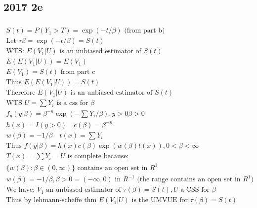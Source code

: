 \documentclass{article}
\newcommand{\B}{\beta}
\begin{document}
\begin{flushleft}

	\section*{2017 2e}
	
	\item 
\begin{multline*}\\
S(t)=P(Y_1>T)=\exp\left(-t/\B \right) \text{ (from part b)}\\
\text{Let } \tau{\B}=\exp\left(-t/\B \right)=S(t)\\
\text{WTS: }  E(V_1|U) \text{ is an unbiased estimator of } S(t)\\
E(E(V_1|U))=E(V_1)\\
E(V_1)=S(t) \text{ from part c}\\
\text{Thus } E(E(V_1|U))=S(t)\\
\text{Therefore } E(V_1|U) \text{ is an unbiased estimator of } S(t)\\
\text{WTS } U=\sum Y_i \text{ is a css for } \B\\
f_y(y|\B)=\B^{-n}\exp\left(-\sum Y_i/\B \right) , y>0 \B>0\\
h(x)=I(y>0) \quad c(\B)=\B^{-n}\\
w(\B)=-1/\B \quad t(x)=\sum Y_i\\
\text{Thus } f(y|\B)=h(x)c(\B)\exp\left(w(\B)t(x)\right),  0<\B<\infty\\
T(x)=\sum Y_i=U \text{ is complete because:}\\
\{w(\B):\B\in (0,\infty)\} \text{ contains an open set in } R^1\\
w(\B)=-1/\B,\B>0=(-\infty,0) \text{ in } R^{-1} \text{ (the range contains an open set in } R^1)\\
\text{We have: } V_1 \text{ an unbiased estimator of } \tau(\B)=S(t), U \text{ a CSS for } \B\\
\text{Thus by lehmann-scheffe thm } E(V_1|U) \text{ is the UMVUE for } \tau(\B)=S(t)\\
\end{multline*}


\end{flushleft}
\end{document}
